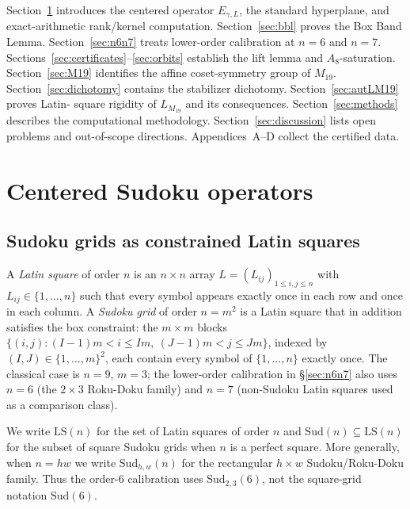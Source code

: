 \documentclass[11pt,a4paper]{article}
\theoremstyle{definition}
\theoremstyle{remark}
\newcommand{\Egamma}{E_{\gamma,L}}
\begin{document}
Section~\ref{sec:setup} introduces the centered operator $\Egamma$,
the standard hyperplane, and exact-arithmetic rank/kernel computation.
Section~\ref{sec:bbl} proves the Box Band Lemma.
Section~\ref{sec:n6n7} treats lower-order calibration at $n = 6$ and
$n = 7$. Sections~\ref{sec:certificates}--\ref{sec:orbits} establish
the lift lemma and $A_8$-saturation. Section~\ref{sec:M19} identifies
the affine coset-symmetry group of $M_{19}$. Section~\ref{sec:dichotomy} contains
the stabilizer dichotomy. Section~\ref{sec:autLM19} proves Latin-
square rigidity of $L_{M_{19}}$ and its consequences.
Section~\ref{sec:methods} describes the computational methodology.
Section~\ref{sec:discussion} lists open problems and out-of-scope
directions. Appendices~A--D collect the certified data.

\section{Centered Sudoku operators}\label{sec:setup}

\subsection{Sudoku grids as constrained Latin squares}
\label{sec:setup-grids}

A \emph{Latin square} of order $n$ is an $n \times n$ array
$L = (L_{ij})_{1 \le i,j \le n}$ with $L_{ij} \in \{1,\dots,n\}$ such
that every symbol appears exactly once in each row and once in each
column. A \emph{Sudoku grid} of order $n = m^2$ is a Latin square that
in addition satisfies the box constraint: the $m \times m$ blocks
$\{(i,j) : (I-1)m < i \le Im,\ (J-1)m < j \le Jm\}$, indexed by
$(I,J) \in \{1,\dots,m\}^2$, each contain every symbol of
$\{1,\dots,n\}$ exactly once. The classical case is $n = 9$, $m = 3$;
the lower-order calibration in \S\ref{sec:n6n7} also uses
$n = 6$ (the $2 \times 3$ Roku-Doku family) and $n = 7$
(non-Sudoku Latin squares used as a comparison class).

We write $\mathrm{LS}(n)$ for the set of Latin squares of order $n$
and $\mathrm{Sud}(n) \subseteq \mathrm{LS}(n)$ for the subset of square
Sudoku grids when $n$ is a perfect square.  More generally, when
$n=hw$ we write $\mathrm{Sud}_{h,w}(n)$ for the rectangular
$h\times w$ Sudoku/Roku-Doku family. Thus the order-$6$ calibration
uses $\mathrm{Sud}_{2,3}(6)$, not the square-grid notation
$\mathrm{Sud}(6)$.
\end{document}
